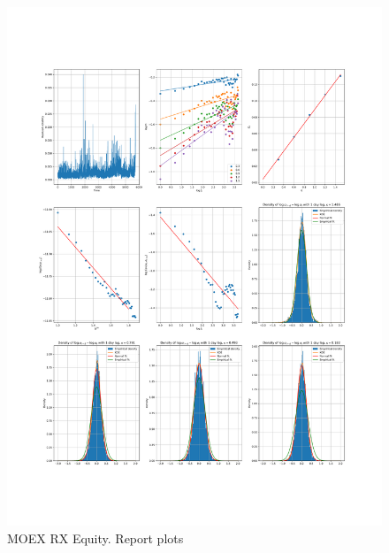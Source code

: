     \begin{figure}[h]
        \centering
        \includegraphics[width=\textwidth]{fig/MOEX RX Equity.pdf}
        \caption{MOEX RX Equity. Report plots}
    \end{figure} 
        
